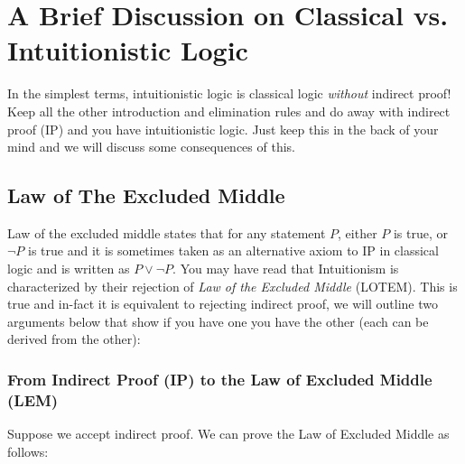 \section{A Brief Discussion on Classical vs. Intuitionistic Logic}
In the simplest terms, intuitionistic logic is classical logic \textit{without} indirect proof! Keep all the other introduction and elimination rules and do away with indirect proof (IP) and you have intuitionistic logic. Just keep this in the back of your mind and we will discuss some consequences of this.



\subsection{Law of The Excluded Middle}
Law of the excluded middle states that for any statement $P$, either $P$ is true, or $\neg P$ is true and it is sometimes taken as an alternative axiom to IP in classical logic and is written as $P \lor \neg P$. You may have read that Intuitionism is characterized by their rejection of \textit{Law of the Excluded Middle} (LOTEM). This is true and in-fact it is equivalent to rejecting indirect proof, we will outline two arguments below that show if you have one you have the other (each can be derived from the other):

\subsubsection*{From Indirect Proof (IP) to the Law of Excluded Middle (LEM)}

Suppose we accept indirect proof. We can prove the Law of Excluded Middle as follows:

